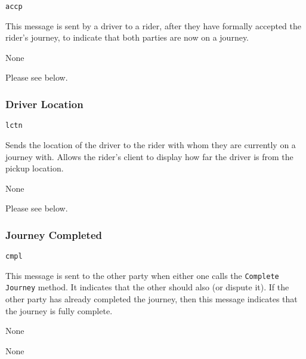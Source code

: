 \begin{description}[leftmargin=6em,style=nextline]
	\item [Topic]
		\lstinline{accp}
	\item [Purpose]
		This message is sent by a driver to a rider, after they have formally accepted the rider's journey, to indicate that both parties are now on a journey.
	\item [Response]
		None
	\item [Payload]
		Please see below.
\end{description}



\subsubsection{Driver Location}

\begin{description}[leftmargin=6em,style=nextline]
	\item [Topic]
		\lstinline{lctn}
	\item [Purpose]
		Sends the location of the driver to the rider with whom they are currently on a journey with. Allows the rider's client to display how far the driver is from the pickup location.
	\item [Response]
		None
	\item [Payload]
		Please see below.
\end{description}



\subsubsection{Journey Completed}

\begin{description}[leftmargin=6em,style=nextline]
	\item [Topic]
		\lstinline{cmpl}
	\item [Purpose]
		This message is sent to the other party when either one calls the \lstinline{Complete Journey} method. It indicates that the other should also (or dispute it). If the other party has already completed the journey, then this message indicates that the journey is fully complete.
	\item [Response]
		None
	\item [Payload]
		None
\end{description}


